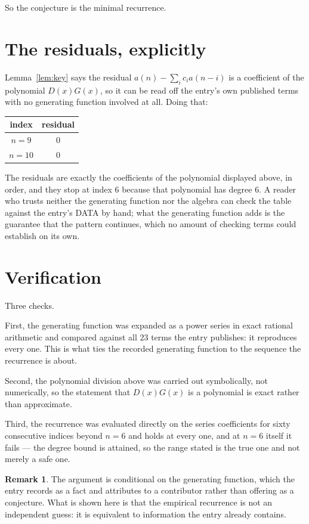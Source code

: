 \documentclass[11pt,a4paper]{article}
\theoremstyle{plain}
\theoremstyle{definition}
\newtheorem{remark}[theorem]{Remark}
\begin{document}
So the conjecture is the minimal recurrence.

\section{The residuals, explicitly}

Lemma~\ref{lem:key} says the residual $a(n)-\sum_ic_ia(n-i)$ is a coefficient of the
polynomial $D(x)G(x)$, so it can be read off the entry's own published terms with no
generating function involved at all. Doing that:
\begin{center}
\begin{tabular}{cc}
index & residual \\ \hline
$n=9$ & $0$ \\
$n=10$ & $0$
\end{tabular}
\end{center}
The residuals are exactly the coefficients of the polynomial displayed above, in order, and
they stop at index $6$ because that polynomial has degree $6$. A reader who trusts
neither the generating function nor the algebra can check the table against the entry's DATA
by hand; what the generating function adds is the guarantee that the pattern continues, which
no amount of checking terms could establish on its own.

\section{Verification}

Three checks.

First, the generating function was expanded as a power series in exact rational arithmetic and
compared against all $23$ terms the entry publishes: it reproduces every one. This is
what ties the recorded generating function to the sequence the recurrence is about.

Second, the polynomial division above was carried out symbolically, not numerically, so the
statement that $D(x)G(x)$ is a polynomial is exact rather than approximate.

Third, the recurrence was evaluated directly on the series coefficients for sixty consecutive
indices beyond $n=6$ and holds at every one, and at $n=6$ itself it fails --- the
degree bound is attained, so the range stated is the true one and not merely a safe one.

\begin{remark}
The argument is conditional on the generating function, which the entry records as a fact and
attributes to a contributor rather than offering as a conjecture. What is shown here is that
the empirical recurrence is not an independent guess: it is equivalent to information the
entry already contains.
\end{remark}
\end{document}
